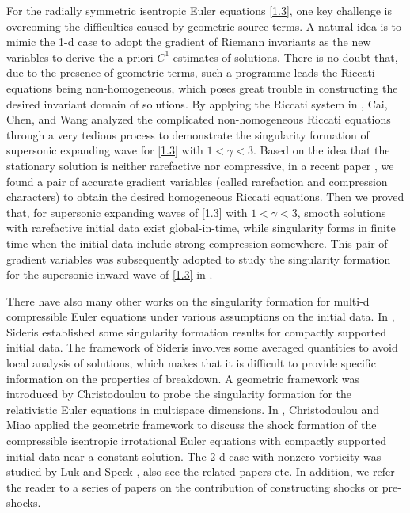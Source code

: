\documentclass[11pt,reqno]{article}
\numberwithin{equation}{section}
\begin{document}
For the radially symmetric isentropic Euler equations \eqref{1.3}, one key challenge is overcoming the difficulties caused by geometric source terms. A natural idea is to mimic the 1-d case to adopt the gradient of Riemann invariants as the new variables to derive the a priori $C^1$ estimates of solutions. There is no doubt that, due to the presence of geometric terms, such a programme leads the Riccati equations being non-homogeneous, which poses great trouble in constructing the desired invariant domain of solutions. By applying the Riccati system in \cite{CYZ}, Cai, Chen, and Wang \cite{CCW} analyzed the complicated non-homogeneous Riccati equations through a very tedious process to demonstrate the singularity formation of supersonic expanding wave for \eqref{1.3} with $1<\gamma<3$. Based on the idea that the stationary solution is neither rarefactive nor compressive, in a recent paper \cite{CEHS1}, we found a pair of accurate gradient variables (called rarefaction and compression characters) to obtain the desired homogeneous Riccati equations. Then we proved that, for supersonic expanding waves of \eqref{1.3} with $1<\gamma<3$, smooth solutions with rarefactive initial data exist global-in-time, while singularity forms in finite time when the initial data include strong compression somewhere. This pair of gradient variables was subsequently adopted to study the  singularity formation for the supersonic inward wave of \eqref{1.3} in \cite{CEHS2}.

There have also many other works on the singularity formation for multi-d compressible Euler equations under various assumptions on the initial data. In \cite{sideris}, Sideris
established some singularity formation results for compactly supported initial data. The framework of Sideris involves some averaged quantities to avoid
local analysis of solutions, which makes that it is difficult to provide specific information on the properties of breakdown. A geometric framework was introduced by Christodoulou \cite{Ch1} to probe the singularity formation for the relativistic Euler equations in multispace dimensions. In \cite{Ch2}, Christodoulou and Miao applied the geometric framework to discuss the shock formation of the compressible isentropic irrotational Euler equations with compactly supported initial data near a constant solution. The 2-d case with nonzero vorticity was studied by Luk and Speck \cite{Luk1}, also see the related papers \cite{Di, Luk2} etc. In addition, we refer the reader to a series of papers \cite{Vicol0, Vicol1, Vicol2, Vicol3, Vicol5, Vicol4, SV, Yin} on the contribution of constructing shocks or pre-shocks.
\end{document}
